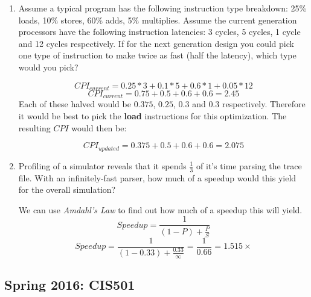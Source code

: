 \documentclass[12pt]{article}
\newenvironment{QandA}{\begin{enumerate}[label=\bfseries\alph*.]\bfseries}
                      {\end{enumerate}}
\newenvironment{answered}{\par\quad\normalfont}{}
\begin{document}
\begin{QandA}
   \item Assume a typical program has the following instruction type breakdown: 25\% loads, 10\% stores, 60\% adds, 5\% multiplies. Assume the current generation processors have the following instruction latencies: 3 cycles, 5 cycles, 1 cycle and 12 cycles respectively. If for the next generation design you could pick one type of instruction to make twice as fast (half the latency), which type would you pick?
        \begin{answered}
        \begin{equation*}
            CPI_{current} = 0.25 * 3 + 0.1 * 5 + 0.6 * 1 + 0.05 * 12
        \end{equation*}
        \begin{equation*}
            CPI_{current} = 0.75 + 0.5 + 0.6 + 0.6 = 2.45
        \end{equation*}
        Each of these halved would be $0.375$, $0.25$, $0.3$ and $0.3$ respectively. Therefore it would be best to pick the \textbf{load} instructions for this optimization. The resulting $CPI$ would then be:
        
        \begin{equation*}
            CPI_{updated} = 0.375 + 0.5 + 0.6 + 0.6 = 2.075
        \end{equation*}
        \end{answered}
        
    \item Profiling of a simulator reveals that it spends $\frac{1}{3}$ of it's time parsing the trace file. With an infinitely-fast parser, how much of a speedup would this yield for the overall simulation?
        \begin{answered}
        We can use \textit{Amdahl's Law} to find out how much of a speedup this will yield.
        \begin{equation*}
            Speedup = \frac{1}{(1-P) + \frac{P}{S}}
        \end{equation*}
        \begin{equation*}
            Speedup = \frac{1}{(1-0.33) + \frac{0.33}{\infty}} = \frac{1}{0.66} = 1.515 \times 
        \end{equation*}        
        \end{answered}
\end{QandA}

\subsection{Spring 2016: CIS501}
\end{document}

